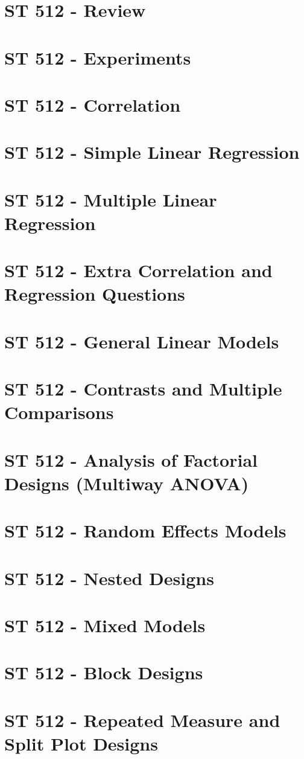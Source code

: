 \documentclass{report}
\begin{document}
\setlength{\topmargin}{0pt}
\setlength{\oddsidemargin}{0pt}

\newpage
{}
\chapter{ST 512 - Review}

\chapter{ST 512 - Experiments}

\chapter{ST 512 - Correlation}

\chapter{ST 512 - Simple Linear Regression}

\chapter{ST 512 - Multiple Linear Regression}

\chapter{ST 512 - Extra Correlation and Regression Questions}

\chapter{ST 512 - General Linear Models}

\chapter{ST 512 - Contrasts and Multiple Comparisons}

\chapter{ST 512 - Analysis of Factorial Designs (Multiway ANOVA)}

\chapter{ST 512 - Random Effects Models}

\chapter{ST 512 - Nested Designs}

\chapter{ST 512 - Mixed Models}

\chapter{ST 512 - Block Designs}

\chapter{ST 512 - Repeated Measure and Split Plot Designs}

\end{document}
